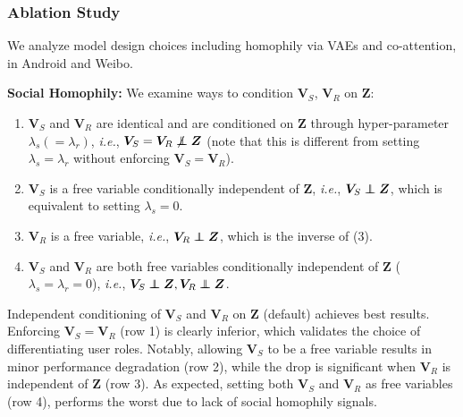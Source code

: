 \documentclass[sigconf]{acmart}
\def\mV{{\bm{V}}}
\def\mZ{{\bm{Z}}}
\newcommand\independent{\protect\mathpalette{\protect\independenT}{\perp}}
\def\independenT#1#2{\mathrel{\rlap{$#1#2$}\mkern2mu{#1#2}}}
\begin{document}
\subsubsection{\textbf{Ablation Study}}
We analyze model design choices including homophily via VAEs and co-attention, in Android and Weibo.

\vspace{2pt}

\noindent \textbf{Social Homophily:} We examine ways to condition $\mV_S$, $\mV_R$ on $\mZ$:
\vspace{-2pt}
\begin{enumerate}[leftmargin=*]
    \item $\mV_S$ and $\mV_R$ are identical and are conditioned on $\mZ$ through hyper-parameter $\lambda_s (=\lambda_r)$, \textit{i.e.}, $\mV_S = \mV_R \not \independent \mZ$ (note that this is different from setting $\lambda_s = \lambda_r$ without enforcing $\mV_S=\mV_R$).
    \item $\mV_S$ is a free variable conditionally independent of $\mZ$, \textit{i.e.}, $\mV_S \independent \mZ$, which is equivalent to setting $\lambda_s=0$.
    \item $\mV_R$ is a free variable, \textit{i.e.}, $\mV_R \independent \mZ$, which is the inverse of (3).
    \item $\mV_S$ and $\mV_R$ are both free variables conditionally independent of $\mZ$ ($\lambda_s= \lambda_r =0$), \textit{i.e.}, $\mV_S \independent \mZ, \mV_R \independent \mZ$.
\end{enumerate}
\vspace{-2pt}




\noindent Independent conditioning of $\mV_S$ and $\mV_R$ on $\mZ$ (default) achieves best results. Enforcing $\mV_S=\mV_R$ (row 1) is clearly inferior,
which validates the choice of differentiating user roles.
Notably, allowing $\mV_S$ to be a free variable 
results in minor performance degradation (row 2), while the drop is significant when $\mV_R$ is independent of $\mZ$ (row 3).
As expected, setting both $\mV_S$ and $\mV_R$ as free variables (row 4),
performs the worst due to lack of social homophily signals.
\end{document}

